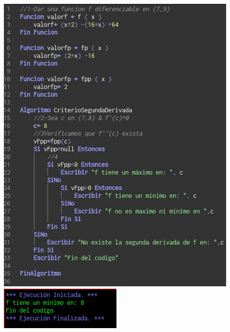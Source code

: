 \documentclass[10pt,a4paper]{article}
\begin{document}
\includegraphics[scale=0.5]{figuras/img3} \\ 
\includegraphics[scale=0.5]{figuras/img4}
\end{document}
